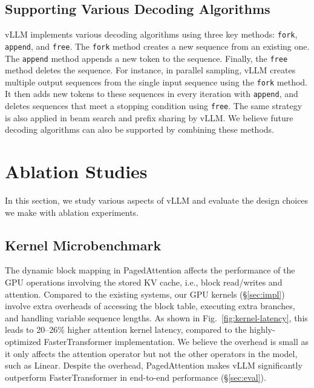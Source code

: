 \documentclass[sigplan,10pt]{acmart}
\newcommand{\tech}[0]{PagedAttention\xspace}
\newcommand{\sys}[0]{vLLM\xspace}
\begin{document}
\subsection{Supporting Various Decoding Algorithms}

\sys implements various decoding algorithms using three key methods: \texttt{fork}, \texttt{append}, and \texttt{free}.
The \texttt{fork} method creates a new sequence from an existing one.
The \texttt{append} method appends a new token to the sequence.
Finally, the \texttt{free} method deletes the sequence.
For instance, in parallel sampling, \sys creates multiple output sequences from the single input sequence using the \texttt{fork} method.
It then adds new tokens to these sequences in every iteration with \texttt{append}, and deletes sequences that meet a stopping condition using \texttt{free}.
The same strategy is also applied in beam search and prefix sharing by \sys.
We believe future decoding algorithms can also be supported by combining these methods.



\section{Ablation Studies}

In this section, we study various aspects of \sys and evaluate the design choices we make with ablation experiments.

\subsection{Kernel Microbenchmark}

The dynamic block mapping in \tech affects the performance of the GPU operations involving the stored KV cache, i.e., block read/writes and attention.
Compared to the existing systems, our GPU kernels (\S\ref{sec:impl}) involve extra overheads of accessing the block table, executing extra branches, and handling variable sequence lengths.
As shown in Fig.~\ref{fig:kernel-latency}, this leads to 20--26\% higher attention kernel latency, compared to the highly-optimized FasterTransformer implementation.
We believe the overhead is small as it only affects the attention operator but not the other operators in the model, such as Linear.
Despite the overhead, \tech makes \sys significantly outperform FasterTransformer in end-to-end performance (\S\ref{sec:eval}).
\end{document}
